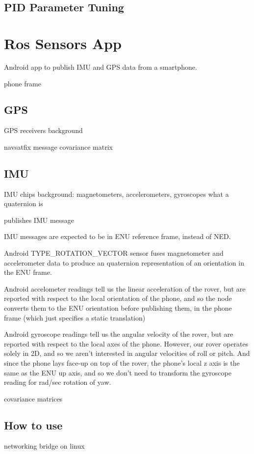 \subsection{PID Parameter Tuning}

\section{Ros Sensors App}
Android app to publish IMU and GPS data from a smartphone.

phone frame

\subsection{GPS}
GPS receivers background

navsatfix message
covariance matrix

\subsection{IMU}
IMU chips background: magnetometers, accelerometers, gyroscopes
what a quaternion is

publishes IMU message

IMU messages are expected to be in ENU reference frame, instead of NED.

Android TYPE\_ROTATION\_VECTOR sensor fuses magnetometer and accelerometer data to produce an quaternion representation of an orientation in the ENU frame.

Android accelometer readings tell us the linear acceleration of the rover, but are reported with respect to the local orientation of the phone, and so the node converts them to the ENU orientation before publishing them, in the phone frame (which just specifies a static translation)

Android gyroscope readings tell us the angular velocity of the rover, but are reported with respect to the local axes of the phone. However, our rover operates solely in 2D, and so we aren't interested in angular velocities of roll or pitch. And since the phone lays face-up on top of the rover, the phone's local z axis is the same as the ENU up axis, and so we don't need to transform the gyroscope reading for rad/sec rotation of yaw.



covariance matrices

\subsection{How to use}
networking bridge
on linux


